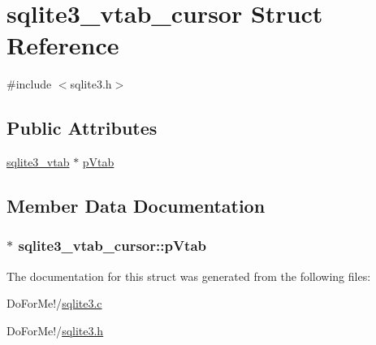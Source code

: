\hypertarget{structsqlite3__vtab__cursor}{\section{sqlite3\-\_\-vtab\-\_\-cursor Struct Reference}
\label{structsqlite3__vtab__cursor}
}


{\ttfamily \#include $<$sqlite3.\-h$>$}

\subsection*{Public Attributes}
\begin{DoxyCompactItemize}
\item 
\hyperlink{structsqlite3__vtab}{sqlite3\-\_\-vtab} $\ast$ \hyperlink{structsqlite3__vtab__cursor_a7bb57f3f9c7c618a9d6d33c6d9820bdc}{p\-Vtab}
\end{DoxyCompactItemize}


\subsection{Member Data Documentation}
\hypertarget{structsqlite3__vtab__cursor_a7bb57f3f9c7c618a9d6d33c6d9820bdc}{
\subsubsection[{p\-Vtab}]{ $\ast$ sqlite3\-\_\-vtab\-\_\-cursor\-::p\-Vtab}}\label{structsqlite3__vtab__cursor_a7bb57f3f9c7c618a9d6d33c6d9820bdc}


The documentation for this struct was generated from the following files\-:\begin{DoxyCompactItemize}
\item 
Do\-For\-Me!/\hyperlink{sqlite3_8c}{sqlite3.\-c}\item 
Do\-For\-Me!/\hyperlink{sqlite3_8h}{sqlite3.\-h}\end{DoxyCompactItemize}
